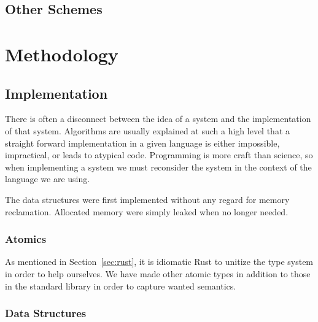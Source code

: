 \documentclass[b5paper]{report}
\begin{document}
\section{Other Schemes}


\chapter{Methodology\label{ch:methodology}}


\section{Implementation}
There is often a disconnect between the idea of a system and the implementation
of that system. Algorithms are usually explained at such a high level that a
straight forward implementation in a given language is either impossible,
impractical, or leads to atypical code. Programming is more craft than
science, so when implementing a system we must reconsider the system in the
context of the language we are using.

The data structures were first implemented without any regard for memory
reclamation. Allocated memory were simply leaked when no longer needed.


\subsection{Atomics}


As mentioned in Section~\ref{sec:rust}, it is idiomatic Rust to unitize the type
system in order to help ourselves. We have made other atomic types in addition
to those in the standard library in order to capture wanted semantics.


\subsection{Data Structures}
\label{sec:data-structures}
\end{document}
